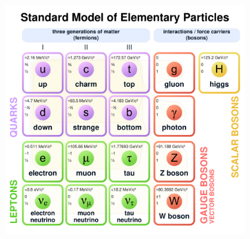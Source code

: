 \newpage
\thispagestyle{empty}
\begin{center}
\vspace*{2em}
\includegraphics[width=0.8\textwidth]{19_CosmicRayMuons/Standard_Model_of_Elementary_Particles.pdf}
\vspace{2em}
\end{center}